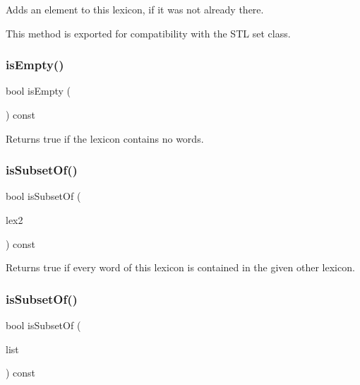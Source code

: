 Adds an element to this lexicon, if it was not already there. 

This method is exported for compatibility with the S\+TL {\ttfamily set} class. \mbox{\label{classDawgLexicon_acf82f9b2937375c7b1cf3dccb3df3312}} 
\subsubsection{\texorpdfstring{is\+Empty()}{isEmpty()}}
{\footnotesize\ttfamily bool is\+Empty (\begin{DoxyParamCaption}{ }\end{DoxyParamCaption}) const}



Returns {\ttfamily true} if the lexicon contains no words. 

\mbox{\label{classDawgLexicon_adbfb8a4218cbe3c3686cd58e63bb9193}} 
\subsubsection{\texorpdfstring{is\+Subset\+Of()}{isSubsetOf()}\hspace{0.1cm}{\footnotesize\ttfamily [1/2]}}
{\footnotesize\ttfamily bool is\+Subset\+Of (\begin{DoxyParamCaption}\item[{const \mbox{\hyperlink{classDawgLexicon}{Dawg\+Lexicon}} \&}]{lex2 }\end{DoxyParamCaption}) const}



Returns {\ttfamily true} if every word of this lexicon is contained in the given other lexicon. 

\mbox{\label{classDawgLexicon_a2a0f1241b53bcf0b31103b79cb01b87d}} 
\subsubsection{\texorpdfstring{is\+Subset\+Of()}{isSubsetOf()}\hspace{0.1cm}{\footnotesize\ttfamily [2/2]}}
{\footnotesize\ttfamily bool is\+Subset\+Of (\begin{DoxyParamCaption}\item[{std\+::initializer\+\_\+list$<$ std\+::string $>$}]{list }\end{DoxyParamCaption}) const}



